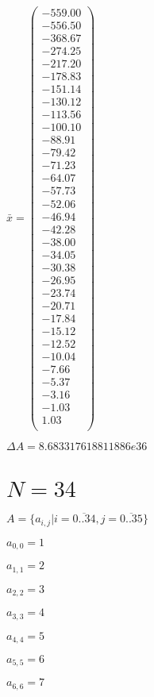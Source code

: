 \documentclass[a4paper,12pt]{article}
\begin{document}
$\bar { x } = \begin{pmatrix}
-559.00 \\
-556.50 \\
-368.67 \\
-274.25 \\
-217.20 \\
-178.83 \\
-151.14 \\
-130.12 \\
-113.56 \\
-100.10 \\
-88.91 \\
-79.42 \\
-71.23 \\
-64.07 \\
-57.73 \\
-52.06 \\
-46.94 \\
-42.28 \\
-38.00 \\
-34.05 \\
-30.38 \\
-26.95 \\
-23.74 \\
-20.71 \\
-17.84 \\
-15.12 \\
-12.52 \\
-10.04 \\
-7.66 \\
-5.37 \\
-3.16 \\
-1.03 \\
1.03 \\
\end{pmatrix}
$

$\Delta A = 8.683317618811886e36$



\section{ $N = 34$ }
$A = \{ a _{ i, j } | i = \overline { 0..34 }, j = \overline { 0..35 } \}$

$a _{ 0, 0 } = 1$

$a _{ 1, 1 } = 2$

$a _{ 2, 2 } = 3$

$a _{ 3, 3 } = 4$

$a _{ 4, 4 } = 5$

$a _{ 5, 5 } = 6$

$a _{ 6, 6 } = 7$
\end{document}
